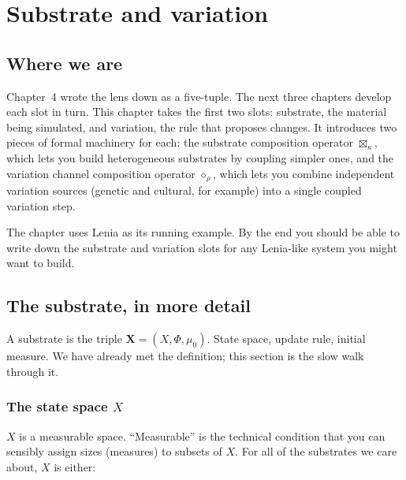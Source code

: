 \chapter{Substrate and variation}

\section{Where we are}

Chapter~4 wrote the lens down as a five-tuple. The next three chapters
develop each slot in turn. This chapter takes the first two slots:
substrate, the material being simulated, and variation, the rule that
proposes changes. It introduces two pieces of formal machinery for
each: the substrate composition operator $\boxtimes_\kappa$, which lets
you build heterogeneous substrates by coupling simpler ones, and the
variation channel composition operator $\diamond_\rho$, which lets you
combine independent variation sources (genetic and cultural, for
example) into a single coupled variation step.

The chapter uses Lenia as its running example. By the end you should be
able to write down the substrate and variation slots for any Lenia-like
system you might want to build.

\section{The substrate, in more detail}

A substrate is the triple $\mathbf{X} = (X, \Phi, \mu_0)$. State space,
update rule, initial measure. We have already met the definition; this
section is the slow walk through it.

\subsection*{The state space $X$}

$X$ is a measurable space. ``Measurable'' is the technical condition
that you can sensibly assign sizes (measures) to subsets of $X$. For
all of the substrates we care about, $X$ is either:

